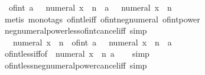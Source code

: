 \begin{isabellebody}
\ \ {\isachardoublequoteopen}of{\isacharunderscore}{\kern0pt}int\ a\ {\isasymle}\ {\isacharparenleft}{\kern0pt}{\isacharminus}{\kern0pt}\ numeral\ x{\isacharparenright}{\kern0pt}\ {\isacharcircum}{\kern0pt}\ n\ {\isasymlongleftrightarrow}\ a\ {\isasymle}\ {\isacharparenleft}{\kern0pt}{\isacharminus}{\kern0pt}\ numeral\ x{\isacharparenright}{\kern0pt}\ {\isacharcircum}{\kern0pt}\ n{\isachardoublequoteclose}\isanewline
%
\isadelimproof
\ \ %
\endisadelimproof
%
\isatagproof
{}\isamarkupfalse%
\ {\isacharparenleft}{\kern0pt}metis\ {\isacharparenleft}{\kern0pt}mono{\isacharunderscore}{\kern0pt}tags{\isacharparenright}{\kern0pt}\ of{\isacharunderscore}{\kern0pt}int{\isacharunderscore}{\kern0pt}le{\isacharunderscore}{\kern0pt}iff\ of{\isacharunderscore}{\kern0pt}int{\isacharunderscore}{\kern0pt}neg{\isacharunderscore}{\kern0pt}numeral\ of{\isacharunderscore}{\kern0pt}int{\isacharunderscore}{\kern0pt}power{\isacharparenright}{\kern0pt}%
\endisatagproof
{\isafoldproof}%
%
\isadelimproof
\isanewline
%
\endisadelimproof
\isanewline
{}\isamarkupfalse%
\ neg{\isacharunderscore}{\kern0pt}numeral{\isacharunderscore}{\kern0pt}power{\isacharunderscore}{\kern0pt}less{\isacharunderscore}{\kern0pt}of{\isacharunderscore}{\kern0pt}int{\isacharunderscore}{\kern0pt}cancel{\isacharunderscore}{\kern0pt}iff\ {\isacharbrackleft}{\kern0pt}simp{\isacharbrackright}{\kern0pt}{\isacharcolon}{\kern0pt}\isanewline
\ \ {\isachardoublequoteopen}{\isacharparenleft}{\kern0pt}{\isacharminus}{\kern0pt}\ numeral\ x{\isacharparenright}{\kern0pt}\ {\isacharcircum}{\kern0pt}\ n\ {\isacharless}{\kern0pt}\ of{\isacharunderscore}{\kern0pt}int\ a\ {\isasymlongleftrightarrow}\ {\isacharparenleft}{\kern0pt}{\isacharminus}{\kern0pt}\ numeral\ x{\isacharparenright}{\kern0pt}\ {\isacharcircum}{\kern0pt}\ n\ {\isacharless}{\kern0pt}\ a{\isachardoublequoteclose}\isanewline
%
\isadelimproof
\ \ %
\endisadelimproof
%
\isatagproof
{}\isamarkupfalse%
\ of{\isacharunderscore}{\kern0pt}int{\isacharunderscore}{\kern0pt}less{\isacharunderscore}{\kern0pt}iff{\isacharbrackleft}{\kern0pt}of\ {\isachardoublequoteopen}{\isacharparenleft}{\kern0pt}{\isacharminus}{\kern0pt}\ numeral\ x{\isacharparenright}{\kern0pt}\ {\isacharcircum}{\kern0pt}\ n{\isachardoublequoteclose}\ a{\isacharbrackright}{\kern0pt}\isanewline
\ \ \isamarkupfalse%
\ simp%
\endisatagproof
{\isafoldproof}%
%
\isadelimproof
\isanewline
%
\endisadelimproof
\isanewline
{}\isamarkupfalse%
\ of{\isacharunderscore}{\kern0pt}int{\isacharunderscore}{\kern0pt}less{\isacharunderscore}{\kern0pt}neg{\isacharunderscore}{\kern0pt}numeral{\isacharunderscore}{\kern0pt}power{\isacharunderscore}{\kern0pt}cancel{\isacharunderscore}{\kern0pt}iff\ {\isacharbrackleft}{\kern0pt}simp{\isacharbrackright}{\kern0pt}{\isacharcolon}{\kern0pt}\isanewline

\end{isabellebody}
